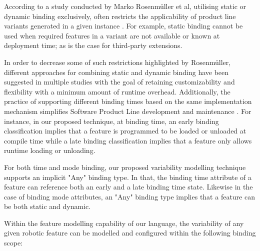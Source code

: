 \documentclass[conference]{IEEEtran}
\begin{document}
According to a study conducted by Marko Rosenmüller et al, utilising static or dynamic binding exclusively, often restricts the applicability of product line variants generated in a given instance \cite{flex-feat-bind}. For example, static binding cannot be used when required features in a variant are not available or known at deployment time; as is the case for third-party extensions. 

In order to decrease some of such restrictions highlighted by Rosenmüller, different approaches for combining static and dynamic binding have been suggested in multiple studies with the goal of retaining customizability and flexibility with a minimum amount of runtime overhead. Additionally, the practice of supporting different binding times based on the same implementation mechanism simplifies Software Product Line development and maintenance \cite{flex-feat-bind}. For instance, in our proposed technique, at binding time, an early binding classification implies that a feature is programmed to be loaded or unloaded at compile time while a late binding classification implies that a feature only allows runtime loading or unloading.

For both time and mode binding, our proposed variability modelling technique supports an implicit "Any" binding type. In that, the binding time attribute of a feature can reference both an early and a late binding time state. Likewise in the case of binding mode attributes, an "Any" binding type implies that a feature can be both static and dynamic.

Within the feature modelling capability of our language, the variability of any given robotic feature can be modelled and configured within the following binding scope:
\end{document}
